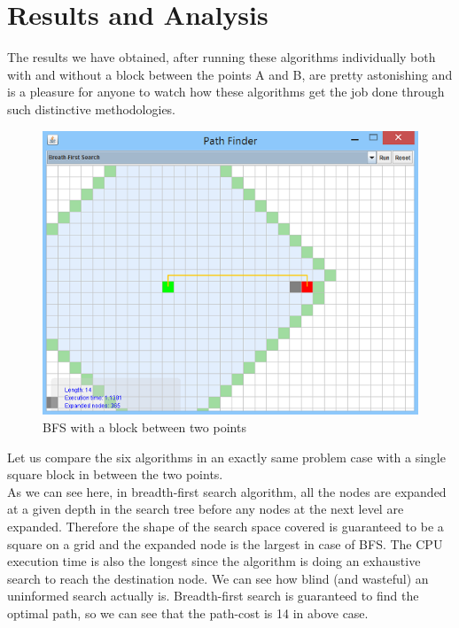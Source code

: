 \documentclass[a4paper]{article}
\begin{document}

\section{Results and Analysis}

The results we have obtained, after running these algorithms individually both with and without a block between the points A and B, are pretty astonishing and is a pleasure for anyone to watch how these algorithms get the job done through such distinctive methodologies.\\

\begin{figure}[h!]
  \centering
    \includegraphics[scale=.9]{images/bfs1.png}
  \caption{BFS with a block between two points}
\end{figure}

\noindent Let us compare the six algorithms in an exactly same problem case with a single square block in between the two points. \\

\noindent As we can see here, in breadth-first search algorithm, all the nodes are expanded at a given depth in the search tree before any nodes at the next level are expanded. Therefore the shape of the search space covered is guaranteed to be a square on a grid and the expanded node is the largest in case of BFS. The CPU execution time is also the longest since the algorithm is doing an exhaustive search to reach the destination node. We can see how blind (and wasteful) an uninformed search actually is. Breadth-first search is guaranteed to find the optimal path, so we can see that the path-cost is 14 in above case. \\
\end{document}
